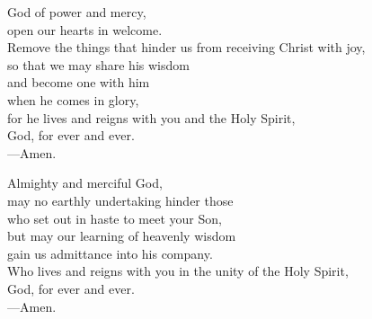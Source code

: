 \prayer


\begin{prayerverse}
God of power and mercy,\\
open our hearts in welcome.\\
Remove the things that hinder us from receiving Christ with joy,\\
so that we may share his wisdom\\
and become one with him\\
when he comes in glory,\\
for he lives and reigns with you and the Holy Spirit,\\
God, for ever and ever.\\
{\color{red}---\thinspace}Amen.
\end{prayerverse}


\begin{prayerverse}
Almighty and merciful God,\\
may no earthly undertaking hinder those\\
who set out in haste to meet your Son,\\
but may our learning of heavenly wisdom\\
gain us admittance into his company.\\
Who lives and reigns with you in the unity of the Holy Spirit,\\
God, for ever and ever.\\
{\color{red}---\thinspace}Amen.
\end{prayerverse}


